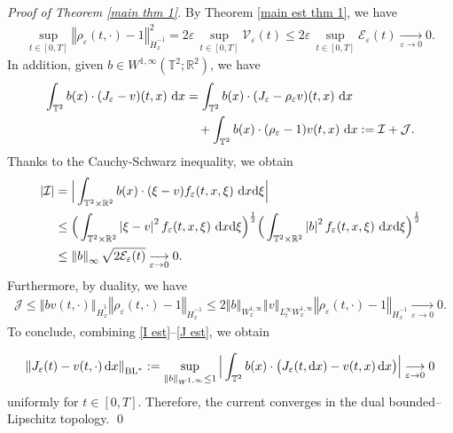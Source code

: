 \documentclass[11pt,reqno]{amsart}
\numberwithin{equation}{section}
\def\dd{{\rm d}}
\begin{document}
\medskip
\textit{Proof of Theorem \ref{main thm 1}.} By Theorem \ref{main est thm 1}, 
we have  
\begin{align*}
\underset{t\in [0,T]}{\sup}\left\Vert \rho_{\varepsilon}(t,\cdot)-1\right\Vert_{\dot{H}^{-1}_{x}}^{2}=2\varepsilon\,\underset{t\in [0,T]}{\sup}\mathcal{V}_{\varepsilon}(t)\le 2\varepsilon\,\underset{t\in [0,T]}{\sup}\mathcal{E}_{\varepsilon}(t)\underset{\varepsilon \rightarrow 0}{\longrightarrow} 0.
\end{align*}
In addition, given $b\in W^{1,\infty}(\mathbb{T}^{2};\mathbb{R}^{2})$, we have 
\begin{align}
\int_{\mathbb{T}^{2}}b(x)\cdot (J_{\varepsilon}-v)(t,x)\ \dd x
&=\int_{\mathbb{T}^{2}}b(x)\cdot(J_{\varepsilon}-\rho_{\varepsilon}v)(t,x)\ \dd x \notag\\
&\quad+\int_{\mathbb{T}^{2}}b(x)\cdot(\rho_{\varepsilon}-1)v(t,x)\ \dd x
 := \mathcal{I}+\mathcal{J}.
\label{test b}
\end{align}
Thanks to the Cauchy-Schwarz inequality, we obtain
\begin{align}
\left|\mathcal{I}\right|&=\Big|\int_{\mathbb{T}^{2}\times\mathbb{R}^{2}} b(x)\cdot (\xi-v)f_{\varepsilon}(t,x,\xi)\ \dd x\dd\xi\Big|\notag\\
&\leq \Big
(\int_{\mathbb{T}^{2}\times \mathbb{R}^{2}}\left\vert \xi-v\right\vert^{2}f_{\varepsilon}(t,x,\xi)\ \dd x\dd \xi\Big)^{\frac{1}{2}}\Big(\int_{\mathbb{T}^{2}\times \mathbb{R}^{2}}\left\vert b\right\vert^{2} f_{\varepsilon}(t,x,\xi)\ \dd x\dd \xi\Big)^{\frac{1}{2}}\nonumber\\
&\leq \left\Vert b\right\Vert_{\infty} \sqrt{2\mathcal{E}_{\varepsilon}(t)}\underset{\varepsilon \rightarrow 0}{\longrightarrow} 0. \label{I est}    
\end{align}
Furthermore, by duality, we have 
\begin{align}
\mathcal{J}\leq \left\Vert bv(t,\cdot)\right\Vert_{\dot H^{1}_{x}}\left\Vert \rho_{\varepsilon}(t,\cdot)-1\right\Vert_{\dot{H}^{-1}_{x}}\leq 2\left\Vert b\right\Vert_{W^{1,\infty}_{x}}\left\Vert v\right\Vert_{L^{\infty}_{t}W^{1,\infty}_{x}}\left\Vert \rho_{\varepsilon}(t,\cdot)-1\right\Vert_{\dot{H}^{-1}_{x}}\underset{\varepsilon \rightarrow 0}{\longrightarrow} 0.     \label{J est}    
\end{align}
To conclude, combining \eqref{I est}--\eqref{J est}, we obtain 

\begin{align*}
\left\Vert J_{\varepsilon}(t)-v(t,\cdot)\,\dd x\right\Vert_{\mathrm{BL}^{*}}
:=\sup_{\|b\|_{W^{1,\infty}}\leq1}
\Big|\int_{\mathbb{T}^{2}}b(x)\cdot\bigl(J_\varepsilon(t,\dd x)-v(t,x)\,\dd x\bigr)\Big|
\underset{\varepsilon \rightarrow 0}{\longrightarrow}0
\end{align*}
uniformly for \(t\in[0,T]\).
Therefore, the current converges in the dual bounded--Lipschitz topology.
\qed
\end{document}

